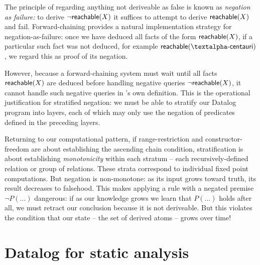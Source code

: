 The principle of regarding anything not deriveable as false is known as
\emph{negation as failure:} to derive $\neg \text{\sffamily reachable}({X})$ it suffices to
attempt to derive $\text{\sffamily reachable}({X})$ and fail.
%
Forward-chaining provides a natural implementation strategy for
negation-as-failure: once we have deduced all facts of the form
$\text{\sffamily reachable}({X})$, if a particular such fact was not deduced, for example
$\atom{reachable}{\datum{\textalpha-centauri}}$, we regard this as proof of its
negation.

However, because a forward-chaining system must wait until all facts
$\text{\sffamily reachable}({X})$ are deduced before handling negative queries
$\neg\text{\sffamily reachable}({X})$, it cannot handle such negative queries in
's own definition.
%
This is the operational justification for stratified negation: we must be able
to stratify our Datalog program into layers, each of which may only use the
negation of predicates defined in the preceding layers.

Returning to our computational pattern, if range-restriction and
constructor-freedom are about establishing the ascending chain condition,
stratification is about establishing \emph{monotonicity} within each stratum --
each recursively-defined relation or group of relations.
%
These strata correspond to individual fixed point computations.
%
But negation is non-monotone: as its input grows toward truth, its result
decreases to falsehood.
%
This makes applying a rule with a negated premise $\neg P(...)$ dangerous: if as
our knowledge grows we learn that $P(...)$ holds after all, we must retract our
conclusion because it is not deriveable.
%
But this violates the condition that our state -- the set of derived atoms -- grows over time!




\section{Datalog for static analysis}
\label{datalog-for-static-analysis}


